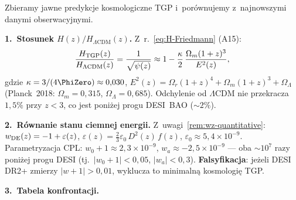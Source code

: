 \begin{remark}\label{rem:cosmo-data}

Zbieramy jawne predykcje kosmologiczne TGP i~por\'ownujemy
z~najnowszymi danymi obserwacyjnymi.

\medskip\noindent
\textbf{1.\ Stosunek $H(z)/H_{\Lambda\mathrm{CDM}}(z)$.}
Z~r.~\eqref{eq:H-Friedmann} (A15):
\begin{equation}\label{eq:H-ratio-explicit}
  \frac{H_{\rm TGP}(z)}{H_{\Lambda\rm CDM}(z)}
  = \frac{1}{\sqrt{\psi(z)}}
  \approx 1 - \frac{\kappa}{2}\,\frac{\Omega_m(1+z)^3}{E^2(z)},
\end{equation}
gdzie $\kappa = 3/(4\PhiZero) \approx 0{,}030$,
$E^2(z) = \Omega_r(1+z)^4 + \Omega_m(1+z)^3 + \Omega_\Lambda$
(Planck~2018: $\Omega_m = 0{,}315$, $\Omega_\Lambda = 0{,}685$).
Odchylenie od $\Lambda$CDM nie przekracza $1{,}5\%$
przy $z < 3$, co jest poni\.zej progu DESI~BAO ($\sim 2\%$).

\medskip\noindent
\textbf{2.\ R\'ownanie stanu ciemnej energii.}
Z~uwagi~\ref{rem:wz-quantitative}:
$w_{\rm DE}(z) = -1 + \varepsilon(z)$,
$\varepsilon(z) = \frac{2}{3}\varepsilon_0\,D^2(z)\,f(z)$,
$\varepsilon_0 \approx 5{,}4 \times 10^{-9}$.
Parametryzacja CPL:
$w_0 + 1 \approx 2{,}3 \times 10^{-9}$, $w_a \approx -2{,}5 \times 10^{-9}$
--- oba $\sim 10^7$ razy poni\.zej progu DESI
(tj.\ $|w_0+1| < 0{,}05$, $|w_a| < 0{,}3$).
\textbf{Falsyfikacja}: je\.zeli DESI DR2+ zmierzy $|w+1| > 0{,}01$,
wyklucza to minimaln\k{a} kosmologi\k{e} TGP.

\medskip\noindent
\textbf{3.\ Tabela konfrontacji.}


\end{remark}
